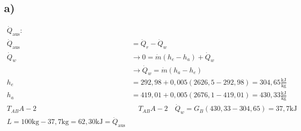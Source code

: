 

\subsection*{a)}
\begin{align*}
    \dot{Q}_{\text{aus}}: \\
    \dot{Q}_{\text{aus}} &= \dot{Q}_r - \dot{Q}_w \\
    \dot{Q}_w &\rightarrow 0 = \dot{m} (h_e - h_a) + \dot{Q}_w \\
    &\rightarrow \dot{Q}_w = \dot{m} (h_a - h_e) \\
    h_e &= 292,98 + 0,005 (2626,5 - 292,98) = 304,65 \frac{\text{kJ}}{\text{kg}} \\
    h_a &= 419,01 + 0,005 (2676,1 - 419,01) = 430,33 \frac{\text{kJ}}{\text{kg}} \\
    T_{AB} A-2 &\quad T_{AB} A-2 \quad \dot{Q}_w = G_B (430,33 - 304,65) = 37,7 \text{kJ} \\
    L = 100 \text{kg} - 37,7 \text{kg} = 62,30 \text{kJ} = \dot{Q}_{\text{aus}}
\end{align*}